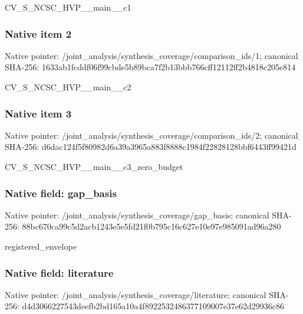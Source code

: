 \documentclass[10pt,a4paper]{article}
\begin{document}
\begingroup\raggedright\sloppy CV\_\allowbreak{}S\_\allowbreak{}NCSC\_\allowbreak{}HVP\_\allowbreak{}\_\allowbreak{}main\_\allowbreak{}\_\allowbreak{}c1\par\endgroup

\subsubsection{Native item 2}
Native pointer: /joint\_\allowbreak{}analysis/synthesis\_\allowbreak{}coverage/comparison\_\allowbreak{}ids/1; canonical SHA-256: 1633ab1fcddf06f99cbde5b89bca7f2b13bbb766cff12112ff2b4818c205e814

\begingroup\raggedright\sloppy CV\_\allowbreak{}S\_\allowbreak{}NCSC\_\allowbreak{}HVP\_\allowbreak{}\_\allowbreak{}main\_\allowbreak{}\_\allowbreak{}c2\par\endgroup

\subsubsection{Native item 3}
Native pointer: /joint\_\allowbreak{}analysis/synthesis\_\allowbreak{}coverage/comparison\_\allowbreak{}ids/2; canonical SHA-256: d6dac124f5f80982d6a39a3965a883f8888c1984f22828128bbf6443ff99421d

\begingroup\raggedright\sloppy CV\_\allowbreak{}S\_\allowbreak{}NCSC\_\allowbreak{}HVP\_\allowbreak{}\_\allowbreak{}main\_\allowbreak{}\_\allowbreak{}c3\_\allowbreak{}zero\_\allowbreak{}budget\par\endgroup

\subsubsection{Native field: gap\_\allowbreak{}basis}
Native pointer: /joint\_\allowbreak{}analysis/synthesis\_\allowbreak{}coverage/gap\_\allowbreak{}basis; canonical SHA-256: 88bc670ca99c5d2acb1243e5e5fd21f0b795c16c627e10e97e985091ad96a280

\begingroup\raggedright\sloppy registered\_\allowbreak{}envelope\par\endgroup

\subsubsection{Native field: literature}
Native pointer: /joint\_\allowbreak{}analysis/synthesis\_\allowbreak{}coverage/literature; canonical SHA-256: d4d3066227543deefb2bd165a10a4f8922532486377109007e37e62d29936c86
\end{document}
